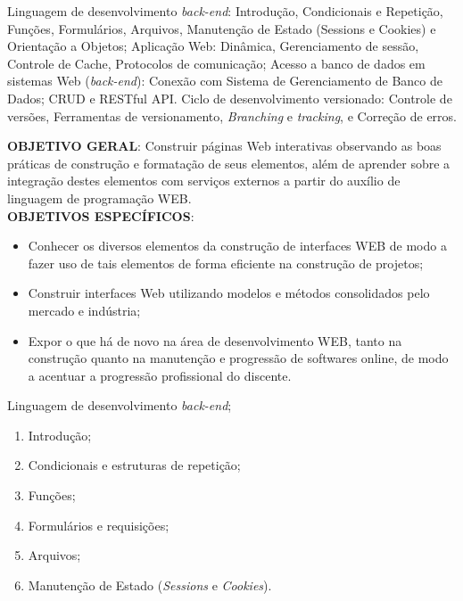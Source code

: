 \begin{pud}
	
	
	\ementa
	Linguagem de desenvolvimento \textit{back-end}: Introdução, Condicionais e Repetição, Funções, Formulários, Arquivos, Manutenção de Estado (Sessions e Cookies) e Orientação a Objetos; Aplicação Web: Dinâmica, Gerenciamento de sessão, Controle de Cache, Protocolos de comunicação;  Acesso a banco de dados em sistemas Web (\textit{back-end}): Conexão com Sistema de Gerenciamento de Banco de Dados; CRUD e RESTful API. Ciclo de desenvolvimento versionado: Controle de versões, Ferramentas de versionamento, \textit{Branching} e \textit{tracking}, e Correção de erros.
	
	\objetivos
	\textbf{OBJETIVO GERAL}:
	Construir páginas Web interativas observando as boas práticas de construção e formatação de seus elementos, além de aprender sobre a integração destes elementos com serviços externos a partir do auxílio de linguagem de programação WEB.	
	\newline\\	
	\textbf{OBJETIVOS ESPECÍFICOS}:
	\begin{itemize}
		
		\item Conhecer os diversos elementos da construção de interfaces WEB de modo a fazer uso de tais elementos de forma eficiente na construção de projetos;
		\item Construir interfaces Web utilizando modelos e métodos consolidados pelo mercado e indústria;
		\item Expor o que há de novo na área de desenvolvimento WEB, tanto na construção quanto na manutenção e progressão de softwares online, de modo a acentuar a progressão profissional do discente.

	\end{itemize}
	
	\programa
	\begin{description}[itemsep=0em]
		\item[UNIDADE I:] Linguagem de desenvolvimento \textit{back-end}; 
	         \begin{enumerate}[itemsep=0em, topsep=0em]
                \item Introdução;
				\item Condicionais e estruturas de repetição;
				\item Funções;
				\item Formulários e requisições;
				\item Arquivos;
				\item Manutenção de Estado (\textit{Sessions} e \textit{Cookies}).
            \end{enumerate}
            

\end{description}
\end{pud}
